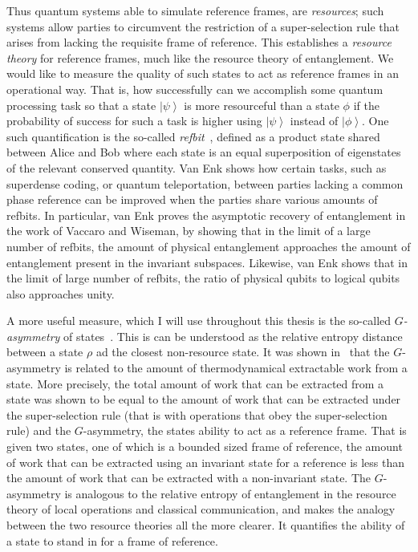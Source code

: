 \documentclass{article}
\newcommand{\ket}[1]{\left|#1\right\rangle}
\newcommand\defn[1]{\textsl{#1}}
\begin{document}
Thus quantum systems able to simulate reference frames, are \defn{resources}; such systems allow parties to circumvent the restriction of a super-selection rule that arises from lacking the requisite frame of reference.  This establishes a \defn{resource theory} for reference frames, much like the resource theory of entanglement.  We would like to measure the quality of such states to act as reference frames in an operational way.  That is, how successfully can we accomplish some quantum processing task so that a state $\ket{\psi}$ is more resourceful than a state $\phi$ if the probability of success for such a task is higher using $\ket{\psi}$ instead of $\ket{\phi}$.   One such quantification is the so-called \defn{refbit}~\cite{vE05}, defined as a product state shared between Alice and Bob where each state is an equal superposition of eigenstates of the relevant conserved quantity.   Van Enk shows how certain tasks, such as superdense coding, or quantum teleportation, between parties lacking a common phase reference can be improved when the parties share various amounts of refbits.   In particular, van Enk proves the asymptotic recovery of entanglement in the work of Vaccaro and Wiseman, by showing that in the limit of a large number of refbits, the amount of physical entanglement approaches the amount of entanglement present in the invariant subspaces.  Likewise, van Enk shows that in the limit of large number of refbits, the ratio of physical qubits to logical qubits also approaches unity. 

A more useful measure, which I will use throughout this thesis is the so-called \defn{$G$-asymmetry} of states~\cite{VAWJ08}.  This is can be understood as the relative entropy distance between a state $\rho$ ad the closest non-resource state.  It was shown in~\cite{VAWJ08} that the $G$-asymmetry is related to the amount of thermodynamical extractable work from a state.  More precisely, the total amount of work that can be extracted from a state was shown to be equal to the amount of work that can be extracted under the super-selection rule (that is with operations that obey the super-selection rule) and the $G$-asymmetry, the states ability to act as a reference frame.  That is given two states, one of which is a bounded sized frame of reference, the amount of work that can be extracted using an invariant state for a reference is less than the amount of work that can be extracted with a non-invariant state.  The $G$-asymmetry is analogous to the relative entropy of entanglement in the resource theory of local operations and classical communication, and makes the analogy between the two resource theories all the more clearer.  It quantifies the ability of a state to stand in for a frame of reference. 
\end{document}
